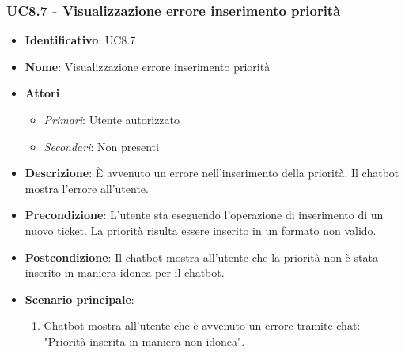 \subsubsection{UC8.7 - Visualizzazione errore inserimento priorità}
\begin{itemize}
	\item \textbf{Identificativo}: UC8.7
	\item \textbf{Nome}:  Visualizzazione errore inserimento priorità
	\item \textbf{Attori}
	\begin{itemize} 
		\item \textit{Primari}: Utente autorizzato
		\item \textit{Secondari}: Non presenti
	\end{itemize}
	\item \textbf{Descrizione}: È avvenuto un errore nell'inserimento della priorità. Il chatbot mostra l'errore all'utente.
	\item \textbf{Precondizione}: L'utente sta eseguendo l'operazione di inserimento di un nuovo ticket. La priorità risulta essere inserito in un formato non valido. 
	\item \textbf{Postcondizione}: Il chatbot mostra all'utente che la priorità non è stata inserito in maniera idonea per il chatbot.
	\item \textbf{Scenario principale}: \begin{enumerate}
		\item Chatbot mostra all'utente che è avvenuto un errore tramite chat: "Priorità inserita in maniera non idonea".
	\end{enumerate}
\end{itemize}
\newpage
